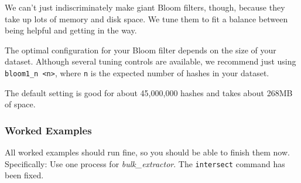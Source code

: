 \documentclass[12pt,twoside]{article}
\newcommand{\bulk}{\emph{bulk\_extractor}\xspace}
\begin{document}
We can't just indiscriminately make giant Bloom filters, though,
because they take up lots of memory and disk space.
We tune them to fit a balance between being helpful and getting in the way.

The optimal configuration for your Bloom filter
depends on the size of your dataset.
Although several tuning controls are available, we recommend just using
\texttt{bloom1\_n <n>}, where \texttt{n} is the expected number of hashes
in your dataset.

The default setting is good for about 45,000,000 hashes
and takes about 268MB of space.


\subsubsection*{Worked Examples}
All worked examples should run fine, so you should be able to finish them now.
Specifically: Use one process for \bulk.
The \texttt{intersect} command has been fixed.
\end{document}
